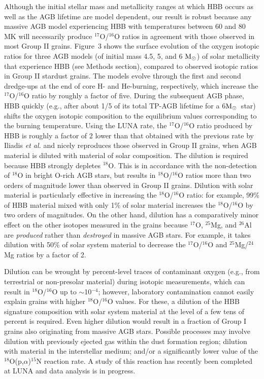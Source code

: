 \documentclass{nature}
\newcommand{\iso}[2]{\hbox{${}^{#1}${#2}}}
\newcommand{\msun}{\ensuremath{{\rm M}_{\odot}}}
\begin{document}
Although the initial stellar mass and metallicity ranges at which HBB occurs as well as the AGB 
lifetime are model 
dependent\cite{ventura13,cristallo15,karakas16}, our result is robust because any massive AGB model 
experiencing HBB with temperatures between 60 and 80 MK will necessarily 
produce \iso{17}O/\iso{16}O ratios in agreement with 
those observed in most Group II grains. Figure~3 shows the surface evolution of 
the oxygen isotopic ratios 
for three AGB models (of initial mass 4.5, 5, and 6 \msun) of solar metallicity that experience HBB (see 
Methods section), compared to observed isotopic ratios in Group II stardust grains. The models evolve 
through the 
first and second dredge-ups at the end of core H- and He-burning, respectively, which increase the 
\iso{17}O/\iso{16}O ratio by roughly a factor of five. During the subsequent AGB phase, HBB quickly 
(e.g., after about 1/5 of its total TP-AGB lifetime for a 6\msun\ star)
shifts the oxygen 
isotopic composition to the equilibrium values corresponding to the burning temperature. Using the 
LUNA rate, the 
\iso{17}O/\iso{16}O ratio produced by HBB is roughly a factor of 2 lower than that obtained with the 
previous 
rate by Iliadis {\it et al.}\cite{iliadis10} and nicely reproduces those observed
 in Group II grains, 
when AGB material is diluted with material of solar composition.
The dilution is required because HBB strongly depletes \iso{18}O. This is 
in accordance with the 
non-detection of \iso{18}O in bright O-rich AGB 
stars\cite{justtanont15}, but results in \iso{18}O/\iso{16}O ratios more than two orders of magnitude 
lower than 
observed in Group II grains. Dilution with solar material is particularly effective
in increasing the \iso{18}O/\iso{16}O ratio: for example, 99\% of 
HBB material mixed with only 1\% of solar material increases the \iso{18}O/\iso{16}O by two orders of 
magnitudes. 
On the other hand, dilution has a comparatively minor effect on the other
isotopes measured in the grains because \iso{17}O, \iso{25}Mg, and \iso{26}Al are
{\em produced} rather than {\em destroyed} in massive AGB stars.
For example, it takes dilution with 50\% of solar system material to decrease
the \iso{17}O/\iso{16}O and \iso{25}Mg/\iso{24}Mg ratios by a factor of 2.

Dilution can be wrought by
percent-level traces of contaminant oxygen (e.g., 
from terrestrial or non-presolar material) during isotopic measurements, which can 
result in \iso{18}O/\iso{16}O up to 
$\sim$10$^{-4}$; however, laboratory contamination cannot easily explain grains with higher 
\iso{18}O/\iso{16}O values. For these, a dilution of the HBB signature composition with solar system 
material
at the level of a few tens of percent is required. 
Even higher dilution would result in a fraction of 
Group I 
grains also originating from massive AGB stars.
Possible processes may involve dilution with previously ejected gas within the 
dust formation region; 
dilution with material in the interstellar medium; and/or
a significantly lower value of the
\iso{18}O(p,$\alpha$)\iso{15}N reaction rate. A study of this 
reaction has recently been completed at LUNA and data analysis is in progress.
\end{document}
